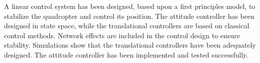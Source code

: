 A linear control system has been designed, based upon a first principles model, to stabilize the quadcopter and control its position. The attitude controller has been designed in state space, while the translational controllers are based on classical control methods. Network effects are included in the control design to ensure stability. Simulations show that the translational controllers have been adequately designed. The attitude controller has been implemented and tested successfully.
